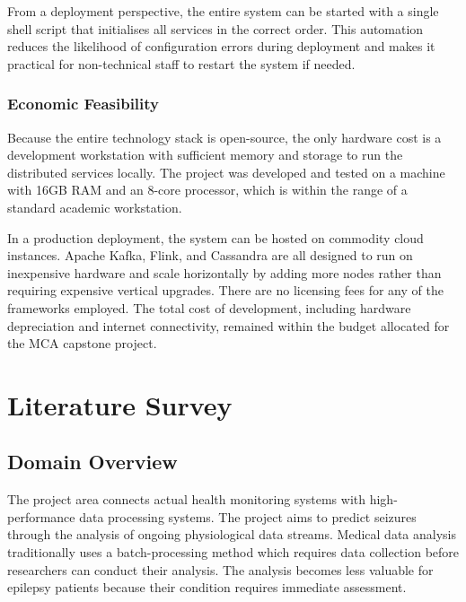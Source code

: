 \documentclass[12pt, a4paper, oneside]{report}
\newcommand{\chapterpage}[2]{%
    \cleardoublepage
    \thispagestyle{empty}
    \vspace*{\fill}
    \begin{center}
        \huge \textbf{Chapter #1} \\
        \vspace{1cm}
        \Huge #2
    \end{center}
    \vspace*{\fill}
    \newpage
}
\begin{document}
From a deployment perspective, the entire system can be started with a single shell script that initialises all services in the correct order. This automation reduces the likelihood of configuration errors during deployment and makes it practical for non-technical staff to restart the system if needed.

\subsection{Economic Feasibility}

Because the entire technology stack is open-source, the only hardware cost is a development workstation with sufficient memory and storage to run the distributed services locally. The project was developed and tested on a machine with 16GB RAM and an 8-core processor, which is within the range of a standard academic workstation.

In a production deployment, the system can be hosted on commodity cloud instances. Apache Kafka, Flink, and Cassandra are all designed to run on inexpensive hardware and scale horizontally by adding more nodes rather than requiring expensive vertical upgrades. There are no licensing fees for any of the frameworks employed. The total cost of development, including hardware depreciation and internet connectivity, remained within the budget allocated for the MCA capstone project.


\chapter{Literature Survey}

\section{Domain Overview}

The project area connects actual health monitoring systems with high-performance data processing systems. The project aims to predict seizures through the analysis of ongoing physiological data streams. Medical data analysis traditionally uses a batch-processing method which requires data collection before researchers can conduct their analysis. The analysis becomes less valuable for epilepsy patients because their condition requires immediate assessment.
\end{document}
